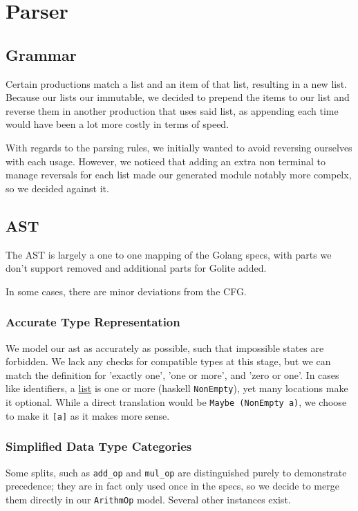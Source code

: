 \documentclass[11pt]{article}
\begin{document}
\section{Parser}
\label{sec:org94d8946}
\subsection{Grammar}
\label{sec:org8e85bcb}
Certain productions match a list and an item of that list,
resulting in a new list. Because our lists our immutable, we
decided to prepend the items to our list and reverse them in
another production that uses said list, as appending each time
would have been a lot more costly in terms of speed.

With regards to the parsing rules, we initially wanted to avoid 
reversing ourselves with each usage. However, we noticed that adding 
an extra non terminal to manage reversals for each list made our 
generated module notably more compelx, so we decided against it.
\subsection{AST}
\label{sec:org47319f3}
The AST is largely a one to one mapping of the Golang specs, with
parts we don't support removed and additional parts for Golite added.

In some cases, there are minor deviations from the CFG.
\subsubsection{Accurate Type Representation}
\label{sec:orga9a087e}
We model our ast as accurately as possible, such that impossible
states are forbidden. We lack any checks for compatible types at
this stage, but we can match the definition for 'exactly one', 'one
or more', and 'zero or one'. In cases like identifiers, a \href{https://golang.org/ref/spec\#IdentifierList}{list} is
one or more (haskell \texttt{NonEmpty}), yet many locations make it
optional. While a direct translation would be \texttt{Maybe (NonEmpty a)},
we choose to make it \texttt{[a]} as it makes more sense.
\subsubsection{Simplified Data Type Categories}
\label{sec:org82fe9ac}
Some splits, such as \texttt{add\_op} and \texttt{mul\_op} are distinguished
purely to demonstrate precedence; they are in fact only used once
in the specs, so we decide to merge them directly in our \texttt{ArithmOp}
model. Several other instances exist.
\end{document}
